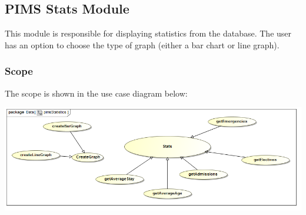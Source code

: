 \subsection{PIMS Stats Module}
This module is responsible for displaying statistics from the database. The user has an option to choose the type of graph (either a bar chart or line graph). \par 

\subsubsection{Scope}
The scope is shown in the use case diagram below: \par
\includegraphics[width=\linewidth]{./Graphics/pimsStats/pimsStatistics}

